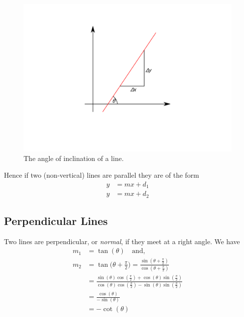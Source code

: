 \documentclass[
]{book}
\theoremstyle{definition}
\theoremstyle{definition}
\theoremstyle{definition}
\theoremstyle{definition}
\theoremstyle{remark}
\begin{document}
\begin{figure}
\includegraphics{figures/inclination} \caption{The angle of inclination of a line.}\label{fig:inclination}
\end{figure}

Hence if two (non-vertical) lines are parallel they are of the form
\begin{align*}
y&=mx + d_1\\
y&=mx + d_2
\end{align*}

\hypertarget{perpendicular-lines}{%
\subsection{Perpendicular Lines}\label{perpendicular-lines}}

Two lines are perpendicular, or \emph{normal}, if they meet at a right angle. We have
\begin{align*}
m_1&=\tan(\theta)\quad\text{and,}\\
m_2&=\tan\Big(\theta + \frac{\pi}{2}\Big)=\frac{\sin(\theta + \frac{\pi}{2})}{\cos(\theta + \frac{\pi}{2})}\\
&=\frac{\sin(\theta)\cos(\frac{\pi}{2}) + \cos(\theta)\sin(\frac{\pi}{2})}{\cos(\theta)\cos(\frac{\pi}{2}) - \sin(\theta)\sin(\frac{\pi}{2})}\\
&=\frac{\cos(\theta)}{-\sin(\theta)}\\
&=-\cot(\theta)
\end{align*}
\end{document}

